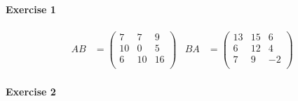 \documentclass{article}
\begin{document}
\paragraph{Exercise 1}

\begin{align*}
    AB &= \begin{pmatrix}
        7 & 7 & 9 \\
        10 & 0 & 5 \\
        6 & 10 & 16 \\
    \end{pmatrix} & 
    BA &= \begin{pmatrix}
        13 & 15 & 6 \\
        6 & 12 & 4 \\
        7 & 9 & -2 \\
    \end{pmatrix}
\end{align*}

\paragraph{Exercise 2}
\end{document}
